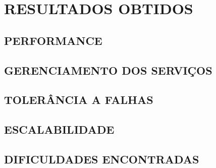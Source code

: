 \chapter{RESULTADOS OBTIDOS}
\label{chp:resultados}

\section{PERFORMANCE}

\section{GERENCIAMENTO DOS SERVIÇOS}

\section{TOLERÂNCIA A FALHAS}

\section{ESCALABILIDADE}

\section{DIFICULDADES ENCONTRADAS}
